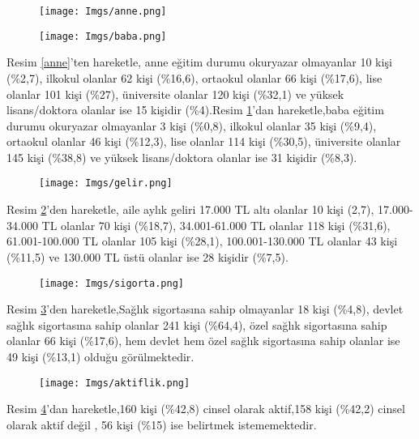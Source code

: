 \documentclass[turkish]{article}
\begin{document}
   \begin{figure}[ht]
    \centering
    \begin{minipage}[b]{0.4\textwidth}
        \centering
        \texttt{[image: Imgs/anne.png]}
        \caption{}
        \label{anne}
    \end{minipage}
    \hfill
    \begin{minipage}[b]{0.45\textwidth}
        \centering
        \texttt{[image: Imgs/baba.png]}
        \caption{}
        \label{baba}
    \end{minipage}
\end{figure}
Resim \ref{anne}'ten hareketle, anne eğitim durumu okuryazar olmayanlar 10 kişi (\%2,7), ilkokul olanlar 62 kişi (\%16,6), ortaokul olanlar 66 kişi (\%17,6), lise olanlar 101 kişi (\%27), üniversite olanlar 120 kişi (\%32,1) ve yüksek lisans/doktora olanlar ise 15 kişidir (\%4).Resim \ref{baba}'dan hareketle,baba eğitim durumu okuryazar olmayanlar 3 kişi (\%0,8), ilkokul olanlar 35 kişi (\%9,4), ortaokul olanlar 46 kişi (\%12,3), lise olanlar 114 kişi (\%30,5), üniversite olanlar 145 kişi (\%38,8) ve yüksek lisans/doktora olanlar ise 31 kişidir (\%8,3). 
\clearpage
      \begin{figure}[ht]
    \centering
    \texttt{[image: Imgs/gelir.png]}
    \caption{}
    \label{gelir}
\end{figure}   
Resim \ref{gelir}'den hareketle, aile aylık geliri 17.000 TL altı olanlar 10 kişi (2,7), 17.000-34.000 TL olanlar 70 kişi (\%18,7), 34.001-61.000 TL olanlar 118 kişi (\%31,6), 61.001-100.000 TL olanlar 105 kişi (\%28,1), 100.001-130.000 TL olanlar 43 kişi (\%11,5) ve 130.000 TL üstü olanlar ise 28 kişidir (\%7,5).

\begin{figure}[ht]
    \centering
    \texttt{[image: Imgs/sigorta.png]}
    \caption{}
    \label{sigorta}
\end{figure}   
Resim \ref{sigorta}'den hareketle,Sağlık sigortasına sahip olmayanlar 18 kişi (\%4,8), devlet sağlık sigortasına sahip olanlar 241 kişi (\%64,4), özel sağlık sigortasına sahip olanlar 66 kişi (\%17,6), hem devlet hem özel sağlık sigortasına sahip olanlar ise  49 kişi (\%13,1) olduğu görülmektedir.

\begin{figure}[ht]
    \centering
    \texttt{[image: Imgs/aktiflik.png]}
    \caption{}
    \label{aktiflik}
\end{figure}  
Resim \ref{aktiflik}'dan hareketle,160 kişi (\%42,8) cinsel olarak aktif,158 kişi (\%42,2) cinsel olarak aktif değil , 56 kişi (\%15) ise belirtmek istememektedir.
\clearpage
    
\end{document}
